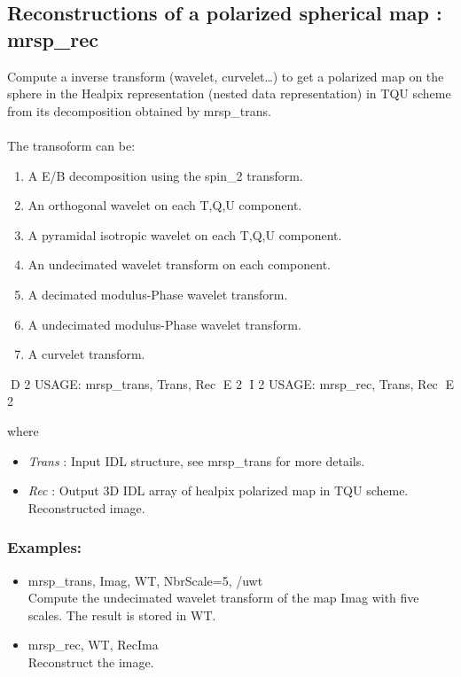 \subsection{Reconstructions of a polarized spherical map : mrsp\_rec}
Compute a inverse transform (wavelet, curvelet\ldots) to get a polarized map on the sphere in the Healpix representation 
(nested data representation) in TQU scheme from its decomposition obtained by mrsp\_trans.\\ \\
The transoform can be:
\begin{enumerate}
\item A E/B decomposition using the spin\_2 transform.
\item An orthogonal wavelet on each T,Q,U component.
\item A pyramidal isotropic wavelet on each T,Q,U component.
\item An undecimated wavelet transform on each component.
\item A decimated modulus-Phase wavelet transform.
\item A undecimated modulus-Phase wavelet transform.
\item A curvelet transform.
\end{enumerate}
{\bf
\begin{center}
D 2
     USAGE: mrsp\_trans, Trans, Rec
E 2
I 2
     USAGE: mrsp\_rec, Trans, Rec
E 2
\end{center}}
where
\begin{itemize}
\item {\em Trans} : Input IDL structure, see mrsp\_trans for more details.
\item {\em Rec} : Output 3D IDL array of healpix polarized map in TQU scheme. Reconstructed image.
\end{itemize}

\subsubsection*{Examples:} 
\begin{itemize}
\item mrsp\_trans, Imag, WT, NbrScale=5, /uwt \\
Compute the undecimated wavelet transform of the map Imag with five scales. The result is stored in WT.
\item mrsp\_rec, WT, RecIma \\
Reconstruct the image.
\end{itemize}



